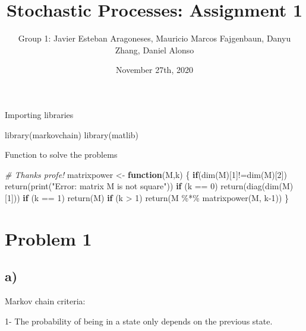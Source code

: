 \documentclass[
]{article}
\title{Stochastic Processes: Assignment 1}
\author{Group 1: Javier Esteban Aragoneses, Mauricio Marcos Fajgenbaun,
Danyu Zhang, Daniel Alonso}
\date{November 27th, 2020}
\newenvironment{Shaded}{\begin{snugshade}}{\end{snugshade}}
\newcommand{\CommentTok}[1]{\textcolor[rgb]{0.56,0.35,0.01}{\textit{#1}}}
\newcommand{\ControlFlowTok}[1]{\textcolor[rgb]{0.13,0.29,0.53}{\textbf{#1}}}
\newcommand{\DecValTok}[1]{\textcolor[rgb]{0.00,0.00,0.81}{#1}}
\newcommand{\FunctionTok}[1]{\textcolor[rgb]{0.00,0.00,0.00}{#1}}
\newcommand{\NormalTok}[1]{#1}
\newcommand{\OtherTok}[1]{\textcolor[rgb]{0.56,0.35,0.01}{#1}}
\newcommand{\SpecialCharTok}[1]{\textcolor[rgb]{0.00,0.00,0.00}{#1}}
\newcommand{\StringTok}[1]{\textcolor[rgb]{0.31,0.60,0.02}{#1}}
\begin{document}
\maketitle

Importing libraries

\begin{Shaded}
\begin{Highlighting}[]
\FunctionTok{library}\NormalTok{(markovchain)}
\FunctionTok{library}\NormalTok{(matlib)}
\end{Highlighting}
\end{Shaded}

Function to solve the problems

\begin{Shaded}
\begin{Highlighting}[]
\CommentTok{\# Thanks profe!}
\NormalTok{matrixpower }\OtherTok{\textless{}{-}} \ControlFlowTok{function}\NormalTok{(M,k) \{}
  \ControlFlowTok{if}\NormalTok{(}\FunctionTok{dim}\NormalTok{(M)[}\DecValTok{1}\NormalTok{]}\SpecialCharTok{!=}\FunctionTok{dim}\NormalTok{(M)[}\DecValTok{2}\NormalTok{]) }\FunctionTok{return}\NormalTok{(}\FunctionTok{print}\NormalTok{(}\StringTok{"Error: matrix M is not square"}\NormalTok{))}
  \ControlFlowTok{if}\NormalTok{ (k }\SpecialCharTok{==} \DecValTok{0}\NormalTok{) }\FunctionTok{return}\NormalTok{(}\FunctionTok{diag}\NormalTok{(}\FunctionTok{dim}\NormalTok{(M)[}\DecValTok{1}\NormalTok{])) }
  \ControlFlowTok{if}\NormalTok{ (k }\SpecialCharTok{==} \DecValTok{1}\NormalTok{) }\FunctionTok{return}\NormalTok{(M)}
  \ControlFlowTok{if}\NormalTok{ (k }\SpecialCharTok{\textgreater{}} \DecValTok{1}\NormalTok{)  }\FunctionTok{return}\NormalTok{(M }\SpecialCharTok{\%*\%} \FunctionTok{matrixpower}\NormalTok{(M, k}\DecValTok{{-}1}\NormalTok{))}
\NormalTok{\}}
\end{Highlighting}
\end{Shaded}

\hypertarget{problem-1}{%
\section{Problem 1}\label{problem-1}}

\hypertarget{a}{%
\subsection{a)}\label{a}}

Markov chain criteria:

1- The probability of being in a state only depends on the previous
state.
\end{document}
